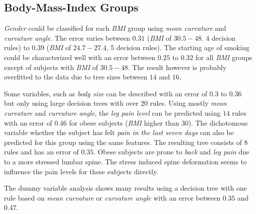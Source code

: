 \documentclass[a4paper,twoside]{style/article}
\newcommand{\com}[1]{\textcolor{orange}{\uline{#1}}}
\begin{document}
\subsection{Body-Mass-Index Groups}
\emph{Gender} could be classified for each \emph{BMI} group using \emph{mean curvature} and \emph{curvature angle}.
The error varies between $0.31$ (\emph{BMI} of \emph{$30.5-48$}. 4 decision rules) to $0.39$ (\emph{BMI} of \emph{$24.7-27.4$}, 5 decision rules).
The starting age of smoking could be characterized well with an error between $0.25$ to $0.32$ for all \emph{BMI} groups except of subjects with \emph{BMI} of \emph{$30.5-48$}.
The result however is probably overfitted to the data due to tree sizes between $14$ and $16$.

Some variables, such as \emph{body size} can be described with an error of $0.3$ to $0.36$ but only using large decision trees with over 20 rules.
Using mostly \emph{mean curvature} and \emph{curvature angle}, the \emph{leg pain level} can be predicted using $14$ rules with an error of $0.46$ for obese subjects (\emph{BMI} higher than $30$).
The dichotomous variable whether the subject has felt \emph{pain in the last seven days} can also be predicted for this group using the same features.
The resulting tree consists of $8$ rules and has an error of $0.35$.
Obese subjects are prone to \emph{back} and \emph{leg pain} due to a more stressed lumbar spine.
The stress induced spine deformation seems to influence the pain levels for these subjects directly.

The dummy variable analysis shows many results using a decision tree with one rule based on \emph{mean curvature} or \emph{curvature angle} with an error between $0.35$ and $0.47$.
\end{document}
